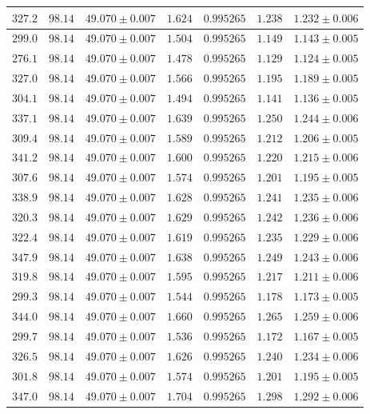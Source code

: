 \documentclass[]{article}
\begin{document}
\begin{table}
\begin{tabular}{||c|c|c|c|c|c|c||}
    $327.2$ & $98.14$ & $49.070 \pm 0.007$ & $1.624$ & $0.995265$ & $1.238$ & $1.232 \pm 0.006$ \\\hline
    $299.0$ & $98.14$ & $49.070 \pm 0.007$ & $1.504$ & $0.995265$ & $1.149$ & $1.143 \pm 0.005$ \\\hline
    $276.1$ & $98.14$ & $49.070 \pm 0.007$ & $1.478$ & $0.995265$ & $1.129$ & $1.124 \pm 0.005$ \\\hline
    $327.0$ & $98.14$ & $49.070 \pm 0.007$ & $1.566$ & $0.995265$ & $1.195$ & $1.189 \pm 0.005$ \\\hline
    $304.1$ & $98.14$ & $49.070 \pm 0.007$ & $1.494$ & $0.995265$ & $1.141$ & $1.136 \pm 0.005$ \\\hline
    $337.1$ & $98.14$ & $49.070 \pm 0.007$ & $1.639$ & $0.995265$ & $1.250$ & $1.244 \pm 0.006$ \\\hline
    $309.4$ & $98.14$ & $49.070 \pm 0.007$ & $1.589$ & $0.995265$ & $1.212$ & $1.206 \pm 0.005$ \\\hline
    $341.2$ & $98.14$ & $49.070 \pm 0.007$ & $1.600$ & $0.995265$ & $1.220$ & $1.215 \pm 0.006$ \\\hline
    $307.6$ & $98.14$ & $49.070 \pm 0.007$ & $1.574$ & $0.995265$ & $1.201$ & $1.195 \pm 0.005$ \\\hline
    $338.9$ & $98.14$ & $49.070 \pm 0.007$ & $1.628$ & $0.995265$ & $1.241$ & $1.235 \pm 0.006$ \\\hline
    $320.3$ & $98.14$ & $49.070 \pm 0.007$ & $1.629$ & $0.995265$ & $1.242$ & $1.236 \pm 0.006$ \\\hline
    $322.4$ & $98.14$ & $49.070 \pm 0.007$ & $1.619$ & $0.995265$ & $1.235$ & $1.229 \pm 0.006$ \\\hline
    $347.9$ & $98.14$ & $49.070 \pm 0.007$ & $1.638$ & $0.995265$ & $1.249$ & $1.243 \pm 0.006$ \\\hline
    $319.8$ & $98.14$ & $49.070 \pm 0.007$ & $1.595$ & $0.995265$ & $1.217$ & $1.211 \pm 0.006$ \\\hline
    $299.3$ & $98.14$ & $49.070 \pm 0.007$ & $1.544$ & $0.995265$ & $1.178$ & $1.173 \pm 0.005$ \\\hline
    $344.0$ & $98.14$ & $49.070 \pm 0.007$ & $1.660$ & $0.995265$ & $1.265$ & $1.259 \pm 0.006$ \\\hline
    $299.7$ & $98.14$ & $49.070 \pm 0.007$ & $1.536$ & $0.995265$ & $1.172$ & $1.167 \pm 0.005$ \\\hline
    $326.5$ & $98.14$ & $49.070 \pm 0.007$ & $1.626$ & $0.995265$ & $1.240$ & $1.234 \pm 0.006$ \\\hline
    $301.8$ & $98.14$ & $49.070 \pm 0.007$ & $1.574$ & $0.995265$ & $1.201$ & $1.195 \pm 0.005$ \\\hline
    $347.0$ & $98.14$ & $49.070 \pm 0.007$ & $1.704$ & $0.995265$ & $1.298$ & $1.292 \pm 0.006$ \\\hline


\end{tabular}
\end{table}
\end{document}
